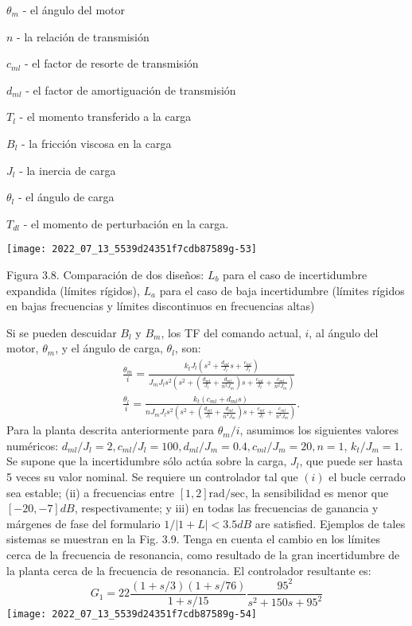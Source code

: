 $\theta_{m}$ - el ángulo del motor

$n$ - la relación de transmisión

$c_{m l}$ - el factor de resorte de transmisión

$d_{m l}$ - el factor de amortiguación de transmisión

$T_{l}$ - el momento transferido a la carga

$B_{l}$ - la fricción viscosa en la carga

$J_{l}$ - la inercia de carga

$\theta_{l}$ - el ángulo de carga

$T_{d l}$ - el momento de perturbación en la carga.

\texttt{[image: 2022\_07\_13\_5539d24351f7cdb87589g-53]}

Figura 3.8. Comparación de dos diseños: $L_{b}$ para el caso de incertidumbre expandida (límites rígidos), $L_{a}$ para el caso de baja incertidumbre (límites rígidos en bajas frecuencias y límites discontinuos en frecuencias altas)

Si se pueden descuidar $B_{l}$ y $B_{m}$, los TF del comando actual, $i$, al ángulo del motor, $\theta_{m}$, y el ángulo de carga, $\theta_{l}$, son:
$$
\begin{aligned}
&\frac{\theta_{m}}{i}=\frac{k_{t} J_{l}\left(s^{2}+\frac{d_{m l}}{J_{l}} s+\frac{c_{m l}}{J_{l}}\right)}{J_{m} J_{l} s^{2}\left(s^{2}+\left(\frac{d_{m l}}{J_{l}}+\frac{d_{m l}}{n^{2} J_{m}}\right) s+\frac{c_{m l}}{J_{l}}+\frac{c_{m l}}{n^{2} J_{m}}\right)} \\
&\frac{\theta_{l}}{i}=\frac{k_{t}\left(c_{m l}+d_{m l} s\right)}{n J_{m} J_{l} s^{2}\left(s^{2}+\left(\frac{d_{m l}}{J_{l}}+\frac{d_{m l}}{n^{2} J_{m}}\right) s+\frac{c_{m l}}{J_{l}}+\frac{c_{m l}}{n^{2} J_{m}}\right)} .
\end{aligned}
$$
Para la planta descrita anteriormente para $\theta_{m} / i$, asumimos los siguientes valores numéricos: $d_{m l} / J_{l}=2, c_{m l} / J_{l}=100, d_{m l} / J_{m}=0.4, c_{m l} / J_{m}=20, n=1$, $k_{t} / J_{m}=1$. Se supone que la incertidumbre sólo actúa sobre la carga, $J_{l}$, que puede ser hasta 5 veces su valor nominal. Se requiere un controlador tal que $(i)$ el bucle cerrado sea estable; (ii) a frecuencias entre $[1,2] \mathrm{rad} / \mathrm{sec}$, la sensibilidad es menor que $[-20,-7] d B$, respectivamente; y iii) en todas las frecuencias de ganancia y márgenes de fase del formulario $1 /|1+L|<3.5 d B$ are satisfied. Ejemplos de tales sistemas se muestran en la Fig. 3.9. Tenga en cuenta el cambio en los límites cerca de la frecuencia de resonancia, como resultado de la gran incertidumbre de la planta cerca de la frecuencia de resonancia. El controlador resultante es:
$$
G_{1}=22 \frac{(1+s / 3)(1+s / 76)}{1+s / 15} \frac{95^{2}}{s^{2}+150 s+95^{2}}
$$
\texttt{[image: 2022\_07\_13\_5539d24351f7cdb87589g-54]}

